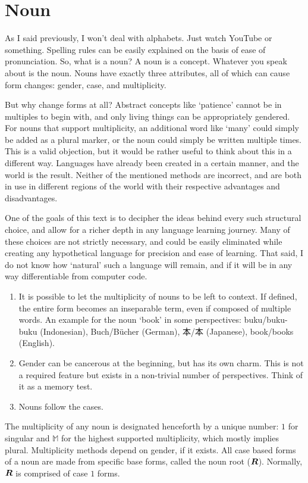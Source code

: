\section{Noun} \label{sec:ennoun}
As I said previously, I won't deal with alphabets. Just watch YouTube or something. Spelling rules can be easily explained on the basis of ease of pronunciation. So, what is a noun? A noun is a concept. Whatever you speak about is the noun. Nouns have exactly three attributes, all of which can cause form changes:   gender, case, and multiplicity.
 
But why change forms at all? Abstract concepts like `patience' cannot  be in multiples to begin with, and only living things can be appropriately gendered. For nouns that support multiplicity, an additional word like `many' could simply be added as a plural marker, or the noun could simply be written multiple times. This is a valid objection, but it would be rather useful to think about this in a different way. Languages have already been created in a certain manner, and the world is the result. Neither of the mentioned methods are incorrect, and are both in use in different regions of the world  with their respective advantages and disadvantages. 

One of the goals of this text is to decipher the ideas behind every such structural choice, and allow for a richer depth in any language learning journey. Many of these choices are not strictly necessary, and could be easily eliminated while creating any hypothetical language for precision and ease of learning. That said, I do not know how `natural' such a language will remain, and if it will be in any way differentiable from computer code.
\begin{enumerate}
    \item It is possible to let the multiplicity of nouns to be left to context. If defined, the entire form becomes an inseparable term, even if composed of multiple words. An example for the noun `book' in some perspectives: buku/buku-buku (Indonesian), Buch/Bücher (German), \textjapanese{本}/\textjapanese{本} (Japanese), book/books (English). 
    \item Gender can be cancerous at the beginning, but has its own charm. This is not a required feature but exists in a non-trivial number of perspectives. Think of it as a memory test.
    \item Nouns follow the cases.
\end{enumerate}
The multiplicity of any noun is designated henceforth by a unique number: $1$ for singular and $\mathbb{M}$ for the highest supported multiplicity, which mostly implies plural. Multiplicity methods depend on gender, if it exists. All case based forms of a noun are made from specific base forms, called the noun root ($\boldsymbol{R}$). Normally, $\boldsymbol{R}$ is comprised of  case $1$  forms.

